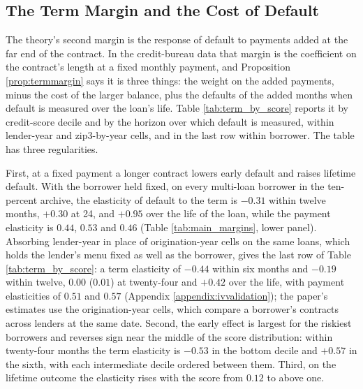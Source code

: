 \subsection{The Term Margin and the Cost of Default}\label{sec:termmargin}\label{sec:termstructure}

The theory's second margin is the response of default to payments added at the far end of the contract. In the credit-bureau data that margin is the coefficient on the contract's length at a fixed monthly payment, and Proposition \ref{prop:termmargin} says it is three things: the weight on the added payments, minus the cost of the larger balance, plus the defaults of the added months when default is measured over the loan's life. Table \ref{tab:term_by_score} reports it by credit-score decile and by the horizon over which default is measured, within lender-year and zip3-by-year cells, and in the last row within borrower. The table has three regularities.

First, at a fixed payment a longer contract lowers early default and raises lifetime default. With the borrower held fixed, on every multi-loan borrower in the ten-percent archive, the elasticity of default to the term is $-0.31$ within twelve months, $+0.30$ at 24, and $+0.95$ over the life of the loan, while the payment elasticity is $0.44$, $0.53$ and $0.46$ (Table \ref{tab:main_margins}, lower panel). Absorbing lender-year in place of origination-year cells on the same loans, which holds the lender's menu fixed as well as the borrower, gives the last row of Table \ref{tab:term_by_score}: a term elasticity of $-0.44$ within six months and $-0.19$ within twelve, $0.00$ ($0.01$) at twenty-four and $+0.42$ over the life, with payment elasticities of $0.51$ and $0.57$ (Appendix \ref{appendix:ivvalidation}); the paper's estimates use the origination-year cells, which compare a borrower's contracts across lenders at the same date. Second, the early effect is largest for the riskiest borrowers and reverses sign near the middle of the score distribution: within twenty-four months the term elasticity is $-0.53$ in the bottom decile and $+0.57$ in the sixth, with each intermediate decile ordered between them. Third, on the lifetime outcome the elasticity rises with the score from $0.12$ to above one.


